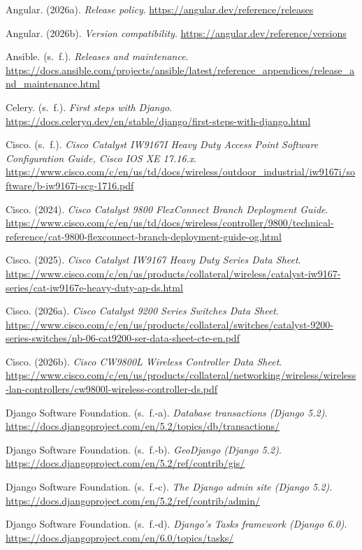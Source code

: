 \begin{list}{}{\setlength{\leftmargin}{1.27cm}\setlength{\itemindent}{-1.27cm}\setlength{\itemsep}{0.5\baselineskip}\raggedright}
\item Angular. (2026a). \textit{Release policy}. \url{https://angular.dev/reference/releases}
\item Angular. (2026b). \textit{Version compatibility}. \url{https://angular.dev/reference/versions}
\item Ansible. (s.~f.). \textit{Releases and maintenance}. \url{https://docs.ansible.com/projects/ansible/latest/reference_appendices/release_and_maintenance.html}
\item Celery. (s.~f.). \textit{First steps with Django}. \url{https://docs.celeryq.dev/en/stable/django/first-steps-with-django.html}
\item Cisco. (s.~f.). \textit{Cisco Catalyst IW9167I Heavy Duty Access Point Software Configuration Guide, Cisco IOS XE 17.16.x}. \url{https://www.cisco.com/c/en/us/td/docs/wireless/outdoor_industrial/iw9167i/software/b-iw9167i-scg-1716.pdf}
\item Cisco. (2024). \textit{Cisco Catalyst 9800 FlexConnect Branch Deployment Guide}. \url{https://www.cisco.com/c/en/us/td/docs/wireless/controller/9800/technical-reference/cat-9800-flexconnect-branch-deployment-guide-og.html}
\item Cisco. (2025). \textit{Cisco Catalyst IW9167 Heavy Duty Series Data Sheet}. \url{https://www.cisco.com/c/en/us/products/collateral/wireless/catalyst-iw9167-series/cat-iw9167e-heavy-duty-ap-ds.html}
\item Cisco. (2026a). \textit{Cisco Catalyst 9200 Series Switches Data Sheet}. \url{https://www.cisco.com/c/en/us/products/collateral/switches/catalyst-9200-series-switches/nb-06-cat9200-ser-data-sheet-cte-en.pdf}
\item Cisco. (2026b). \textit{Cisco CW9800L Wireless Controller Data Sheet}. \url{https://www.cisco.com/c/en/us/products/collateral/networking/wireless/wireless-lan-controllers/cw9800l-wireless-controller-ds.pdf}
\item Django Software Foundation. (s.~f.-a). \textit{Database transactions (Django 5.2)}. \url{https://docs.djangoproject.com/en/5.2/topics/db/transactions/}
\item Django Software Foundation. (s.~f.-b). \textit{GeoDjango (Django 5.2)}. \url{https://docs.djangoproject.com/en/5.2/ref/contrib/gis/}
\item Django Software Foundation. (s.~f.-c). \textit{The Django admin site (Django 5.2)}. \url{https://docs.djangoproject.com/en/5.2/ref/contrib/admin/}
\item Django Software Foundation. (s.~f.-d). \textit{Django's Tasks framework (Django 6.0)}. \url{https://docs.djangoproject.com/en/6.0/topics/tasks/}

\end{list}
